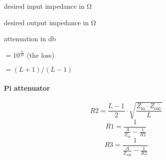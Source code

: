 \documentclass[varwidth,convert={density=300,size=800x800,outext=.png}]{standalone}
\newcommand{\Zin}{Z_\mathrm{in}}
\newcommand{\Zout}{Z_\mathrm{out}}
\begin{document}
\begin{description}[labelindent=0pt,labelsep=10pt]
\item[$\Zin$] desired input impedance in \si{\ohm}
\item[$\Zout$] desired output impedance in \si{\ohm}
\item[$a$] attenuation in \si{\decibel}
\item[$L$] $= 10^{\frac{a}{10}}$ (the loss)
\item[$A$] $= (L+1)/(L-1)$
\end{description}

\paragraph{Pi attenuator}

\[R2 = \frac{L - 1}{2} \cdot \sqrt{\frac{\Zin \cdot \Zout}{L}} \]
\[R1 = \frac{1}{ \frac{A}{\Zin} -  \frac{1}{R2}}\]
\[R3 = \frac{1}{ \frac{A}{\Zout} -  \frac{1}{R2}}\]



\end{document}
